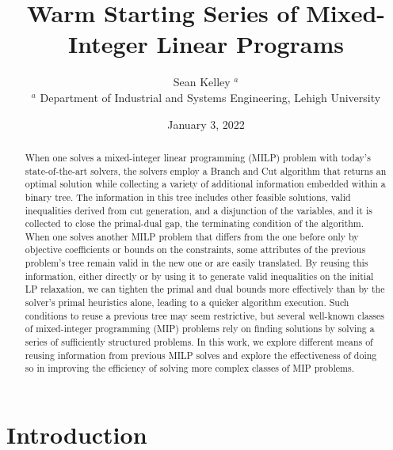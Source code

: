 \documentclass[10pt]{article}
\begin{document}
	\title{Warm Starting Series of Mixed-Integer Linear Programs}
	\author{Sean Kelley $^a$ \\
		$^a$ Department of Industrial and Systems Engineering, Lehigh University}
	\date{January 3, 2022}
	\maketitle
	
	\bigskip
	
	\begin{abstract}
		When one solves a mixed-integer linear programming (MILP) problem with today’s state-of-the-art solvers, the solvers employ a Branch and Cut algorithm that returns an optimal solution while collecting a variety of additional information embedded within a binary tree. The information in this tree includes other feasible solutions, valid inequalities derived from cut generation, and a disjunction of the variables, and it is collected to close the primal-dual gap, the terminating condition of the algorithm. When one solves another MILP problem that differs from the one before only by objective coefficients or bounds on the constraints, some attributes of the previous problem’s tree remain valid in the new one or are easily translated. By reusing this information, either directly or by using it to generate valid inequalities on the initial LP relaxation, we can tighten the primal and dual bounds more effectively than by the solver’s primal heuristics alone, leading to a quicker algorithm execution. Such conditions to reuse a previous tree may seem restrictive, but several well-known classes of mixed-integer programming (MIP) problems rely on finding solutions by solving a series of sufficiently structured problems. In this work, we explore different means of reusing information from previous MILP solves and explore the effectiveness of doing so in improving the efficiency of solving more complex classes of MIP problems.
	\end{abstract}
	
	\section{Introduction} \label{s:intro}
	
\end{document}
